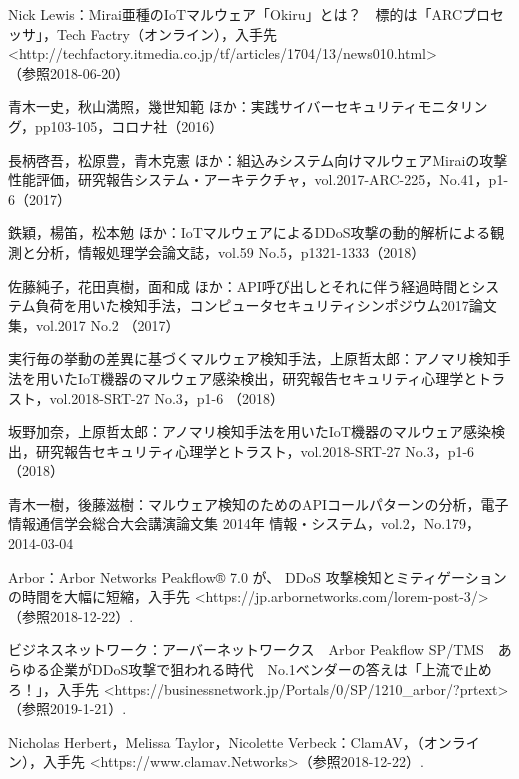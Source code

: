 \begin{thebibliography}{30}
        Nick Lewis：Mirai亜種のIoTマルウェア「Okiru」とは？　標的は「ARCプロセッサ」，Tech Factry（オンライン），入手先\textless http:\slash\slash{}techfactory.itmedia.co.jp\slash{}tf\slash{}articles\slash{}1704\slash{}13\slash{}news010.html\textgreater\\（参照2018-06-20）
    
        青木一史，秋山満照，幾世知範 ほか：実践サイバーセキュリティモニタリング，pp103-105，コロナ社（2016）

        長柄啓吾，松原豊，青木克憲 ほか：組込みシステム向けマルウェアMiraiの攻撃性能評価，研究報告システム・アーキテクチャ，vol.2017-ARC-225，No.41，p1-6（2017）
    
        鉄穎，楊笛，松本勉 ほか：IoTマルウェアによるDDoS攻撃の動的解析による観測と分析，情報処理学会論文誌，vol.59 No.5，p1321-1333（2018）

        佐藤純子，花田真樹，面和成 ほか：API呼び出しとそれに伴う経過時間とシステム負荷を用いた検知手法，コンピュータセキュリティシンポジウム2017論文集，vol.2017 No.2 （2017）

        実行毎の挙動の差異に基づくマルウェア検知手法，上原哲太郎：アノマリ検知手法を用いたIoT機器のマルウェア感染検出，研究報告セキュリティ心理学とトラスト，vol.2018-SRT-27 No.3，p1-6 （2018）

        坂野加奈，上原哲太郎：アノマリ検知手法を用いたIoT機器のマルウェア感染検出，研究報告セキュリティ心理学とトラスト，vol.2018-SRT-27 No.3，p1-6 （2018）

         青木一樹，後藤滋樹：マルウェア検知のためのAPIコールパターンの分析，電子情報通信学会総合大会講演論文集 2014年 情報・システム，vol.2，No.179，2014-03-04

         Arbor：Arbor Networks Peakflow® 7.0 が、 DDoS 攻撃検知とミティゲーションの時間を大幅に短縮，入手先 \textless https:\slash\slash{}jp.arbornetworks.com\slash{}lorem-post-3\slash{}\textgreater （参照2018-12-22）.
    
         ビジネスネットワーク：アーバーネットワークス　Arbor Peakflow SP/TMS　あらゆる企業がDDoS攻撃で狙われる時代　No.1ベンダーの答えは「上流で止めろ！」，入手先 \textless https:\slash\slash{}businessnetwork.jp\slash{}Portals\slash{}0\slash{}SP\slash{}1210\_arbor\slash{}?prtext\textgreater （参照2019-1-21）.

         Nicholas Herbert，Melissa Taylor，Nicolette Verbeck：ClamAV，（オンライン），入手先 \textless https:\slash\slash{}www.clamav.Networks\textgreater（参照2018-12-22）.


\end{thebibliography}
